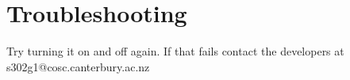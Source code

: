 \section{Troubleshooting}

Try turning it on and off again. If that fails contact the developers at s302g1@cosc.canterbury.ac.nz
